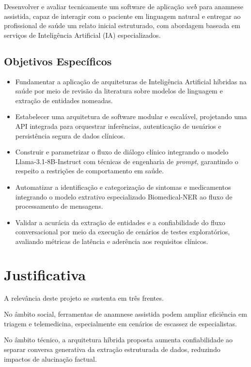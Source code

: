 Desenvolver e avaliar tecnicamente um software de aplicação \textit{web} para anamnese assistida,
capaz de interagir com o paciente em linguagem natural e entregar ao profissional de saúde um
relato inicial estruturado, com abordagem baseada em serviços de Inteligência Artificial (IA) especializados.

\subsection{Objetivos Específicos}

\begin{itemize}
\item Fundamentar a aplicação de arquiteturas de Inteligência Artificial híbridas na saúde por meio de revisão da literatura sobre modelos de linguagem e extração de entidades nomeadas.
\item Estabelecer uma arquitetura de software modular e escalável, projetando uma API integrada para orquestrar inferências, autenticação de usuários e persistência segura de dados clínicos.
\item Construir e parametrizar o fluxo de diálogo clínico integrando o modelo Llama-3.1-8B-Instruct com técnicas de engenharia de \textit{prompt}, garantindo o respeito a restrições de comportamento em saúde.
\item Automatizar a identificação e categorização de sintomas e medicamentos integrando o modelo extrativo especializado Biomedical-NER ao fluxo de processamento de mensagens.
\item Validar a acurácia da extração de entidades e a confiabilidade do fluxo conversacional por meio da execução de cenários de testes exploratórios, avaliando métricas de latência e aderência aos requisitos clínicos.
\end{itemize}

\section{Justificativa}

A relevância deste projeto se sustenta em três frentes.

No âmbito social, ferramentas de anamnese assistida podem ampliar eficiência em triagem e
telemedicina, especialmente em cenários de escassez de especialistas.

No âmbito técnico, a arquitetura híbrida proposta aumenta confiabilidade ao separar conversa
generativa da extração estruturada de dados, reduzindo impactos de alucinação factual.

